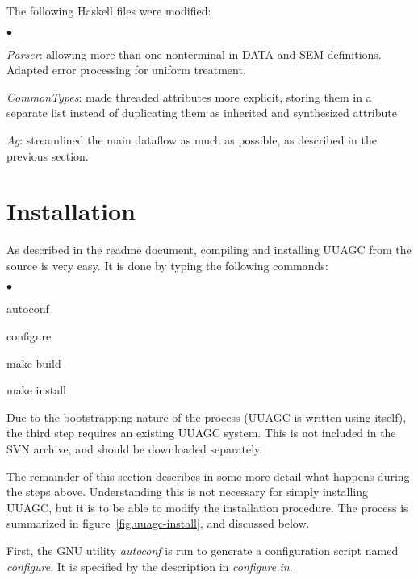 \documentclass[twoside]{article}
\newenvironment{itize}{\begin{list}{$\bullet$}{\parsep=0pt\parskip=0pt\topsep=0pt\itemsep=0pt}}{\end{list}}
\begin{document}
The following Haskell files were modified:
\begin{itize}
\item {\em Parser}:
      allowing more than one nonterminal in DATA and SEM definitions.
      Adapted error processing for uniform treatment.
\item {\em CommonTypes}:
      made threaded attributes more explicit, storing them in a separate list
      instead of duplicating them as inherited and synthesized attribute
\item {\em Ag}:
      streamlined the main dataflow as much as possible,
      as described in the previous section.
\end{itize}



\section{Installation}

As described in the readme document, compiling and installing UUAGC from the source
is very easy. It is done by typing the following commands:
\begin{itize}
\item autoconf
\item configure
\item make build
\item make install
\end{itize}
Due to the bootstrapping nature of the process
(UUAGC is written using itself), the third step requires an existing UUAGC system.
This is not included in the SVN archive, and should be downloaded separately.

The remainder of this section describes in some more detail what happens during
the steps above. 
Understanding this is not necessary for simply installing UUAGC,
but it is to be able to modify the installation procedure.
The process is summarized in figure~\ref{fig.uuagc-install}, and discussed below.

First, the GNU utility {\em autoconf} is run to generate a configuration script
named {\em configure}. It is specified by the description in {\em configure.in}.
\end{document}
